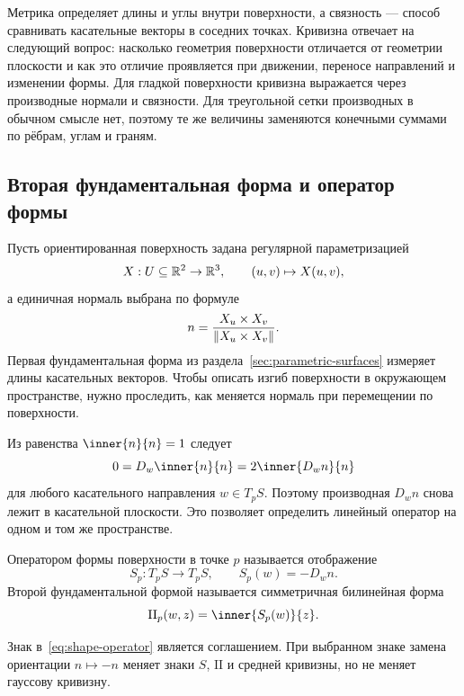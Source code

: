 Метрика определяет длины и углы внутри поверхности, а связность --- способ сравнивать касательные векторы в соседних точках. Кривизна отвечает на следующий вопрос: насколько геометрия поверхности отличается от геометрии плоскости и как это отличие проявляется при движении, переносе направлений и изменении формы. Для гладкой поверхности кривизна выражается через производные нормали и связности. Для треугольной сетки производных в обычном смысле нет, поэтому те же величины заменяются конечными суммами по рёбрам, углам и граням.

\subsection{Вторая фундаментальная форма и оператор формы}

Пусть ориентированная поверхность задана регулярной параметризацией
\[
X:U\subseteq\mathbb{R}^2\to\mathbb{R}^3,
\qquad
(u,v)\mapsto X(u,v),
\]
а единичная нормаль выбрана по формуле
\[
n=\frac{X_u\times X_v}{\lVert X_u\times X_v\rVert}.
\]
Первая фундаментальная форма из раздела~\ref{sec:parametric-surfaces} измеряет длины касательных векторов. Чтобы описать изгиб поверхности в окружающем пространстве, нужно проследить, как меняется нормаль при перемещении по поверхности.

Из равенства \(\inner{n}{n}=1\) следует
\[
0=D_w\inner{n}{n}=2\inner{D_wn}{n}
\]
для любого касательного направления \(w\in T_pS\). Поэтому производная \(D_wn\) снова лежит в касательной плоскости. Это позволяет определить линейный оператор на одном и том же пространстве.

\begin{definition}
Оператором формы поверхности в точке \(p\) называется отображение
\begin{equation}
\label{eq:shape-operator}
S_p:T_pS\to T_pS,
\qquad
S_p(w)=-D_wn.
\end{equation}
Второй фундаментальной формой называется симметричная билинейная форма
\begin{equation}
\label{eq:second-fundamental-form}
\mathrm{II}_p(w,z)=\inner{S_p(w)}{z}.
\end{equation}
\end{definition}

Знак в~\eqref{eq:shape-operator} является соглашением. При выбранном знаке замена ориентации \(n\mapsto-n\) меняет знаки \(S\), \(\mathrm{II}\) и средней кривизны, но не меняет гауссову кривизну.

